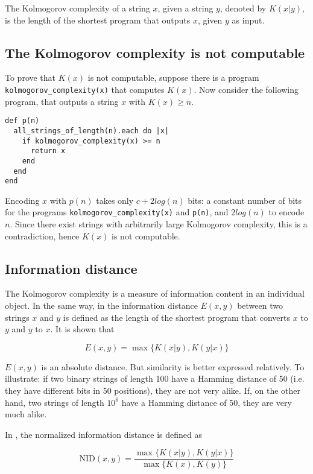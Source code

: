 The Kolmogorov complexity of a string $x$, given a string $y$, denoted by $K(x|y)$, is the length of the shortest program that outputs $x$, given $y$ as input.

\subsection{The Kolmogorov complexity is not computable}

To prove that $K(x)$ is not computable, suppose there is a program \lstinline{kolmogorov_complexity(x)} that computes $K(x)$. Now consider the following program, that outputs a string $x$ with $K(x) \geq n$.

\begin{lstlisting}[frame=single]
def p(n)
  all_strings_of_length(n).each do |x|
    if kolmogorov_complexity(x) >= n
      return x
    end
  end
end
\end{lstlisting}

Encoding $x$ with $p(n)$ takes only $c + 2log(n)$ bits: a constant number of bits for the programs \lstinline{kolmogorov_complexity(x)} and \lstinline{p(n)}, and $2log(n)$ to encode $n$. Since there exist strings with arbitrarily large Kolmogorov complexity, this is a contradiction, hence $K(x)$ is not computable.

\subsection{Information distance}

The Kolmogorov complexity is a measure of information content in an individual object. In the same way, in \cite{Bennett1998} the information distance $E(x, y)$ between two strings $x$ and $y$ is defined as the length of the shortest program that converts $x$ to $y$ and $y$ to $x$. It is shown that

$$ E(x, y) = \max \{ K(x|y), K(y|x) \} $$

$E(x, y)$ is an absolute distance. But similarity is better expressed relatively. To illustrate: if two binary strings of length 100 have a Hamming distance of 50 (i.e. they have different bits in 50 positions), they are not very alike. If, on the other hand, two strings of length $10^{6}$ have a Hamming distance of 50, they are very much alike.

In \cite{Li2004}, the normalized information distance is defined as

\begin{equation}\label{nid}
  \text{NID}(x, y) = \frac{\max \{ K(x|y), K(y|x) \}}{\max \{ K(x), K(y)\}}
\end{equation}

